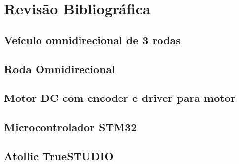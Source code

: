 
\chapter{Revisão Bibliográfica}


\section{Veículo omnidirecional de 3 rodas}


\section{Roda Omnidirecional}


\section{Motor DC com encoder e driver para motor}


\section{Microcontrolador STM32}


\section{Atollic TrueSTUDIO}


